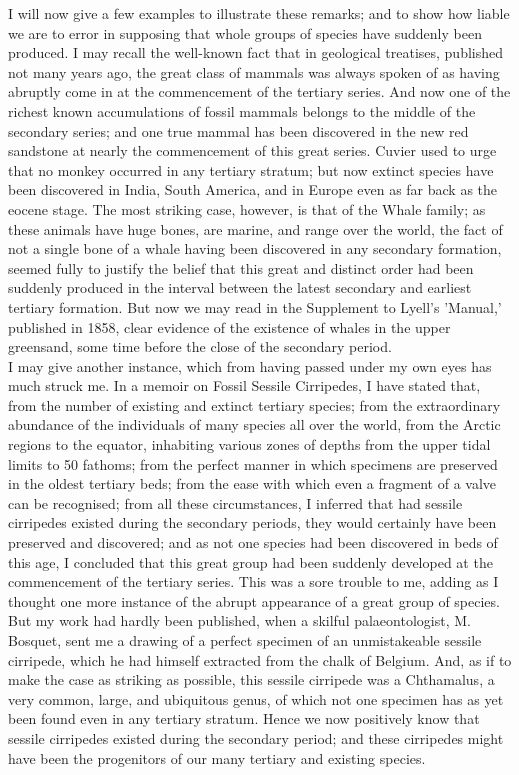 \indent I will now give a few examples to illustrate these remarks; and to show how liable we are to error in supposing that whole groups of species have suddenly been produced. I may recall the well-known fact that in geological treatises, published not many years ago, the great class of mammals was always spoken of as having abruptly come in at the commencement of the tertiary series. And now one of the richest known accumulations of fossil mammals belongs to the middle of the secondary series; and one true mammal has been discovered in the new red sandstone at nearly the commencement of this great series. Cuvier used to urge that no monkey occurred in any tertiary stratum; but now extinct species have been discovered in India, South America, and in Europe even as far back as the eocene stage. The most striking case, however, is that of the Whale family; as these animals have huge bones, are marine, and range over the world, the fact of not a single bone of a whale having been discovered in any secondary formation, seemed fully to justify the belief that this great and distinct order had been suddenly produced in the interval between the latest secondary and earliest tertiary formation. But now we may read in the Supplement to Lyell's 'Manual,' published in 1858, clear evidence of the existence of whales in the upper greensand, some time before the close of the secondary period.\\
\indent I may give another instance, which from having passed under my own eyes has much struck me. In a memoir on Fossil Sessile Cirripedes, I have stated that, from the number of existing and extinct tertiary species; from the extraordinary abundance of the individuals of many species all over the world, from the Arctic regions to the equator, inhabiting various zones of depths from the upper tidal limits to 50 fathoms; from the perfect manner in which specimens are preserved in the oldest tertiary beds; from the ease with which even a fragment of a valve can be recognised; from all these circumstances, I inferred that had sessile cirripedes existed during the secondary periods, they would certainly have been preserved and discovered; and as not one species had been discovered in beds of this age, I concluded that this great group had been suddenly developed at the commencement of the tertiary series. This was a sore trouble to me, adding as I thought one more instance of the abrupt appearance of a great group of species. But my work had hardly been published, when a skilful palaeontologist, M. Bosquet, sent me a drawing of a perfect specimen of an unmistakeable sessile cirripede, which he had himself extracted from the chalk of Belgium.  And, as if to make the case as striking as possible, this sessile cirripede was a Chthamalus, a very common, large, and ubiquitous genus, of which not one specimen has as yet been found even in any tertiary stratum. Hence we now positively know that sessile cirripedes existed during the secondary period; and these cirripedes might have been the progenitors of our many tertiary and existing species.\\
